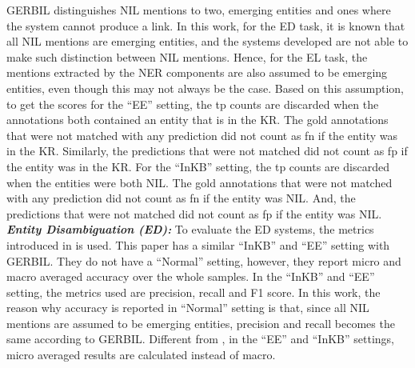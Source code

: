 \documentclass{report}
\theoremstyle{definition}
\theoremstyle{remark}
\begin{document}
GERBIL distinguishes NIL mentions to two, emerging entities and ones where the system cannot produce a link. In this work, for the ED task, it is known that all NIL mentions are emerging entities, and the systems developed are not able to make such distinction between NIL mentions. Hence, for the EL task, the mentions extracted by the NER components are also assumed to be emerging entities, even though this may not always be the case. Based on this assumption, to get the scores for the ``EE'' setting, the tp counts are discarded when the annotations both contained an entity that is in the KR. The gold annotations that were not matched with any prediction did not count as fn if the entity was in the KR. Similarly, the predictions that were not matched did not count as fp if the entity was in the KR. For the ``InKB'' setting, the tp counts are discarded when the entities were both NIL. The gold annotations that were not matched with any prediction did not count as fn if the entity was NIL. And, the predictions that were not matched did not count as fp if the entity was NIL.
\newline
\newline
\textit{\textbf{Entity Disambiguation (ED):}} To evaluate the ED systems, the metrics introduced in \cite{NILMentions} is used. This paper has a similar ``InKB'' and ``EE'' setting with GERBIL. They do not have a ``Normal'' setting, however, they report micro and macro averaged accuracy over the whole samples. In the ``InKB'' and ``EE'' setting, the metrics used are precision, recall and F1 score. In this work, the reason why accuracy is reported in ``Normal'' setting is that, since all NIL mentions are assumed to be emerging entities, precision and recall becomes the same according to GERBIL. Different from \cite{NILMentions}, in the ``EE'' and ``InKB'' settings, micro averaged results are calculated instead of macro. 
\end{document}
